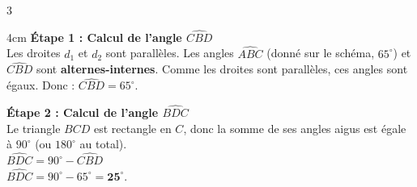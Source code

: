 \documentclass[a4paper]{book}
\begin{document}
{\begin{exerciceNote}{3}
        \begin{ZoneReponse}{4cm}
            \textbf{Étape 1 : Calcul de l'angle $\widehat{CBD}$} \\
            Les droites $d_1$ et $d_2$ sont parallèles. Les angles $\widehat{ABC}$ (donné sur le schéma, $65^\circ$) et $\widehat{CBD}$ sont \textbf{alternes-internes}. 
            Comme les droites sont parallèles, ces angles sont égaux. Donc : $\widehat{CBD} = 65^\circ$.
    
            \medskip
    
            \textbf{Étape 2 : Calcul de l'angle $\widehat{BDC}$} \\
            Le triangle $BCD$ est rectangle en $C$, donc la somme de ses angles aigus est égale à $90^\circ$ (ou $180^\circ$ au total). \\
            $\widehat{BDC} = 90^\circ - \widehat{CBD}$ \\
            $\widehat{BDC} = 90^\circ - 65^\circ = \mathbf{25^\circ}$.
        \end{ZoneReponse}
    \end{exerciceNote}

}
\end{document}
